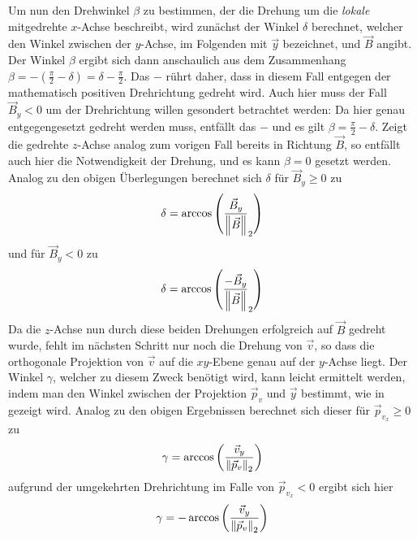 Um nun den Drehwinkel \(\beta\) zu bestimmen, der die Drehung um die \textit{lokale} mitgedrehte \(x\)-Achse beschreibt, wird
zun\"achst der Winkel \(\delta\) berechnet, welcher den Winkel zwischen der \(y\)-Achse, im Folgenden mit \(\vec{y}\) bezeichnet,
und \(\vec{B}\) angibt. Der Winkel \(\beta\) ergibt sich dann anschaulich aus dem Zusammenhang
\(\beta = -\left(\frac{\pi}{2} - \delta\right) = \delta - \frac{\pi}{2}\). Das \(-\) r\"uhrt daher, dass in diesem Fall entgegen
der mathematisch positiven Drehrichtung gedreht wird. Auch hier muss der Fall \(\vec{B}_y < 0 \) um der Drehrichtung willen
gesondert betrachtet werden: Da hier genau entgegengesetzt gedreht werden muss, entf\"allt das \(-\) und es gilt
\(\beta = \frac{\pi}{2} - \delta\). Zeigt die gedrehte \(z\)-Achse analog zum vorigen Fall bereits in
Richtung \(\vec{B}\), so entf\"allt auch
hier die Notwendigkeit der Drehung, und es kann \(\beta = 0\) gesetzt werden. Analog zu den obigen \"Uberlegungen berechnet sich
\(\delta\) f\"ur \(\vec{B}_y \geq 0\) zu
\begin{equation}
  \delta = \arccos{\left(\frac{\vec{B}_y}{\left\lVert\vec{B}\right\rVert}_2\right)}
\end{equation}
und f\"ur \(\vec{B}_y < 0 \) zu
\begin{equation}
  \delta = \arccos{\left(\frac{-\vec{B}_y}{\left\lVert\vec{B}\right\rVert}_2\right)}
\end{equation}
Da die \(z\)-Achse nun durch diese beiden Drehungen erfolgreich auf \(\vec{B}\) gedreht wurde, fehlt im n\"achsten Schritt nur noch
die Drehung von \(\vec{v}\), so dass die orthogonale Projektion von \(\vec{v}\) auf die \(xy\)-Ebene genau auf der \(y\)-Achse
liegt. Der Winkel \(\gamma\), welcher zu diesem Zweck ben\"otigt wird, kann leicht ermittelt werden, indem man den Winkel zwischen
der Projektion \(\vec{p}_v\) und \(\vec{y}\) bestimmt, wie in  gezeigt wird.
Analog zu den obigen Ergebnissen berechnet sich dieser f\"ur \(\vec{p}_{v_x} \geq 0\) zu
\begin{equation}
  \gamma = \arccos{\left(\frac{\vec{v}_y}{\left\lVert\vec{p}_v\right\rVert_2}\right)}
\end{equation}
aufgrund der umgekehrten Drehrichtung im Falle von \(\vec{p}_{v_x} < 0\) ergibt sich hier
\begin{equation}
  \gamma = -\arccos{\left(\frac{\vec{v}_y}{\left\lVert\vec{p}_v\right\rVert_2}\right)}
\end{equation}

